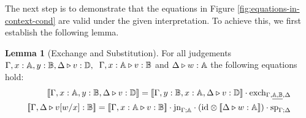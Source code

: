 \documentclass[10pt,a4paper]{amsart}
\theoremstyle{definition}
\theoremstyle{definition}
\theoremstyle{definition}
\newtheorem{lemma}[definition]{Lemma}
\theoremstyle{definition}
\theoremstyle{definition}
\theoremstyle{definition}
\begin{document}
The next step is to demonstrate that the equations in Figure \ref{fig:equations-in-context-cond} are valid under the given interpretation. To achieve this, we first establish the following lemma.

\begin{lemma}[Exchange and Substitution]
\label{lem_interpret_exch:sub} 
For all judgements $\Gamma,x:\mathbb{A}, y:\mathbb{B}, \Delta \triangleright v: \mathbb{D}, \> $
$\Gamma,x:\mathbb{A} \triangleright v: \mathbb{B}$ and $\Delta \triangleright w: \mathbb{A}$  the following
equations hold: 
  \begin{equation*}
\begin{split}
  [\![\Gamma,x:\typeA, y:\typeB, \Delta \vljud v: \typeD]\!] = [\![\Gamma,y:\typeB,x:\typeA,  \Delta \vljud v: \typeD]\! ] \comp \text{exch}_{\Gamma, \underline{ \typeA, \typeB} ,\Delta} \\
  [\![\Gamma, \Delta \vljud v[w/x]: \typeB]\!] = [\![\Gamma, x:\typeA \vljud v: \typeB]\!]\comp \text{jn}_{\Gamma;\typeA} \comp (\text{id} \otimes [\![ \Delta  \vljud w: \typeA]\!] ) \comp \text{sp}_{\Gamma;\Delta} 
\end{split}
  \end{equation*}
\end{lemma}
\end{document}

